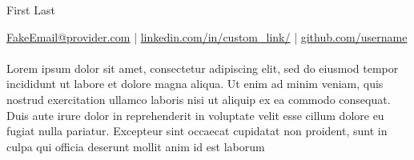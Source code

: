 \documentclass[11pt,letterpaper]{article}
\newcommand{\emaillink}[1]{\href{mailto:#1}{#1}}
\newcommand{\genericlink}[1]{\href{https://www.#1}{#1}}
\begin{document}

\centerline{\Huge First Last}
\centerline{ \emaillink{FakeEmail@provider.com} | \genericlink{linkedin.com/in/custom\_link/} | \genericlink{github.com/username}}
\vspace{-8pt}
    \noindent\hrulefill
\vspace*{-18pt}

\paragraph*{ }Lorem ipsum dolor sit amet, consectetur adipiscing elit, sed do eiusmod tempor incididunt ut labore et dolore magna aliqua. Ut enim ad minim veniam, quis nostrud exercitation ullamco laboris nisi ut aliquip ex ea commodo consequat. Duis aute irure dolor in reprehenderit in voluptate velit esse cillum dolore eu fugiat nulla pariatur. Excepteur sint occaecat cupidatat non proident, sunt in culpa qui officia deserunt mollit anim id est laborum
\begin{comment}
\begin{itemize} ### Use Bullet points, if necessary/better formatted.
  \item Lorem ipsum dolor sit amet, consectetur adipiscing elit, sed do eiusmod tempor incididunt ut labore et dolore magna aliqua. Ut enim ad
  \item minim veniam, quis nostrud exercitation ullamco laboris nisi ut aliquip ex ea commodo consequat. Duis aute irure dolor in reprehenderit
  \item in voluptate velit esse cillum dolore eu fugiat nulla pariatur. Excepteur sint occaecat cupidatat non proident, sunt in culpa qui officia
  \item deserunt mollit anim id est laborum.
\end{itemize}
\end{comment}

\vspace*{-15pt}

\end{document}
